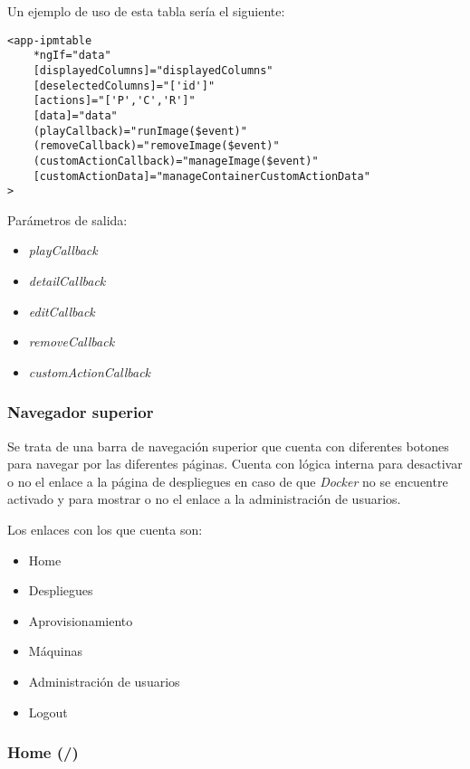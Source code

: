Un ejemplo de uso de esta tabla sería el siguiente:

\begin{lstlisting}
<app-ipmtable
	*ngIf="data"
	[displayedColumns]="displayedColumns"
	[deselectedColumns]="['id']"
	[actions]="['P','C','R']"
	[data]="data"
	(playCallback)="runImage($event)"
	(removeCallback)="removeImage($event)"
	(customActionCallback)="manageImage($event)"
	[customActionData]="manageContainerCustomActionData"
>
\end{lstlisting}



\bigskip
Parámetros de salida:
\begin{itemize}
	\item \textit{playCallback}
	\item \textit{detailCallback}
	\item \textit{editCallback}
	\item \textit{removeCallback}
	\item \textit{customActionCallback}
\end{itemize}



\subsubsection{Navegador superior}

Se trata de una barra de navegación superior que cuenta con diferentes botones para navegar por las diferentes páginas. Cuenta con lógica interna para desactivar o no el enlace a la página de despliegues en caso de que \textit{Docker} no se encuentre activado y para mostrar o no el enlace a la administración de usuarios.

\bigskip
Los enlaces con los que cuenta son:
\begin{itemize}
	\item Home
	\item Despliegues
	\item Aprovisionamiento
	\item Máquinas
	\item Administración de usuarios
	\item Logout
\end{itemize}



\subsubsection{Home (/)}

